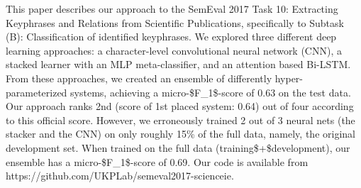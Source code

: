 This paper describes our approach to the SemEval 2017 Task 10: Extracting Keyphrases and Relations from Scientific Publications, specifically to Subtask (B): Classification of identified keyphrases. We explored three different deep learning approaches: a character-level convolutional neural network (CNN), a stacked learner with an MLP meta-classifier, and an attention based Bi-LSTM. From these approaches, we created an ensemble of differently hyper-parameterized systems, achieving a micro-\$F\_1\$-score of 0.63 on the test data. Our approach ranks 2nd (score of 1st placed system: 0.64) out of four according to this official score. However, we erroneously trained 2 out of 3 neural nets (the stacker and the CNN) on only roughly 15\% of the full data, namely, the original development set. When trained on the full data (training\$+\$development), our ensemble has a micro-\$F\_{1}\$-score of 0.69. Our code is available from https://github.com/UKPLab/semeval2017-scienceie.
